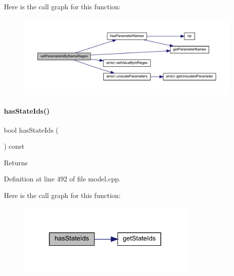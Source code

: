 Here is the call graph for this function\+:
\nopagebreak
\begin{figure}[H]
\begin{center}
\leavevmode
\includegraphics[width=350pt]{classamici_1_1_model_a1307ed45ccda80e84174d6b495c85d8d_cgraph}
\end{center}
\end{figure}
\mbox{\label{classamici_1_1_model_ad85d26b9b10e042e39685ac6c39d6a50}} 
\paragraph{\texorpdfstring{hasStateIds()}{hasStateIds()}}
{\footnotesize\ttfamily bool has\+State\+Ids (\begin{DoxyParamCaption}{ }\end{DoxyParamCaption}) const\hspace{0.3cm}{\ttfamily [virtual]}}

\begin{DoxyReturn}{Returns}

\end{DoxyReturn}


Definition at line 492 of file model.\+cpp.

Here is the call graph for this function\+:
\nopagebreak
\begin{figure}[H]
\begin{center}
\leavevmode
\includegraphics[width=251pt]{classamici_1_1_model_ad85d26b9b10e042e39685ac6c39d6a50_cgraph}
\end{center}
\end{figure}
\mbox{\label{classamici_1_1_model_a15fad6b42dcd725bdfc74fbab31b85e2}} 
